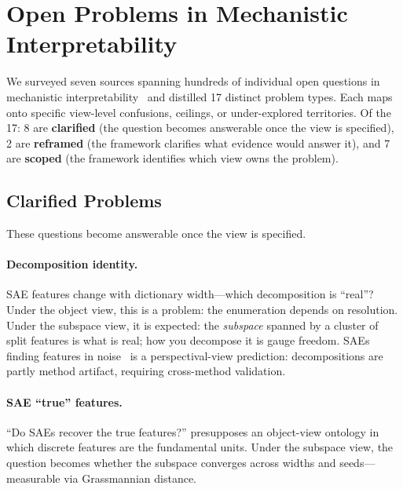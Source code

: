 \documentclass{article}
\begin{document}
\section{Open Problems in Mechanistic Interpretability}\label{app:openprobs}

We surveyed seven sources spanning hundreds of individual open questions
in mechanistic interpretability~\citep{sharkey2025,nanda2022open,
apollo2024,schmidt2026,steinhardt2026,williams2025,mib2025}
and distilled 17 distinct problem types.  Each maps onto specific
view-level confusions, ceilings, or under-explored territories.
Of the 17: 8 are \textbf{clarified} (the question becomes answerable once the
view is specified), 2 are \textbf{reframed} (the framework clarifies what
evidence would answer it), and 7 are \textbf{scoped} (the framework
identifies which view owns the problem).

\subsection{Clarified Problems}

These questions become answerable once the view is specified.

\paragraph{Decomposition identity.}
SAE features change with dictionary width---which decomposition is
``real''?  Under the object view, this is a problem: the enumeration
depends on resolution.  Under the subspace view, it is expected: the
\emph{subspace} spanned by a cluster of split features is what is
real; how you decompose it is gauge freedom.  SAEs finding features
in noise~\citep{bricken2023} is a perspectival-view prediction:
decompositions are partly method artifact, requiring cross-method
validation.

\paragraph{SAE ``true'' features.}
``Do SAEs recover the true features?'' presupposes an object-view
ontology in which discrete features are the fundamental units.  Under
the subspace view, the question becomes whether the subspace converges
across widths and seeds---measurable via Grassmannian distance.
\end{document}
